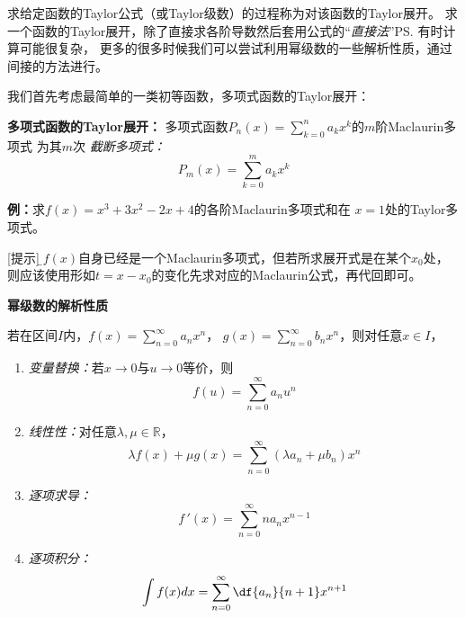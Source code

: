 求给定函数的Taylor公式（或Taylor级数）的过程称为对该函数的{\kaishu Taylor展开}。
求一个函数的Taylor展开，除了直接求各阶导数然后套用公式的“{\it 直接法}”\ps{有时计算可能很复杂}，
更多的很多时候我们可以尝试利用幂级数的一些解析性质，通过间接的方法进行。


我们首先考虑最简单的一类初等函数，多项式函数的Taylor展开：

\begin{thx}
	{\bf 多项式函数的Taylor展开：}
	多项式函数$P_n(x)=\sum\limits_{k=0}^na_kx^k$的$m$阶Maclaurin多项式
	为其$m$次 {\it 截断多项式：} 
	$$P_m(x)=\sum\limits_{k=0}^ma_kx^k$$
\end{thx}

{\bf 例：}求$f(x)=x^3+3x^2-2x+4$的各阶Maclaurin多项式和在
$x=1$处的Taylor多项式。

[提示]：{\b$f(x)$自身已经是一个Maclaurin多项式，但若所求展开式是在某个$x_0$处，
则应该使用形如$t=x-x_0$的变化先求对应的Maclaurin公式，再代回即可。}

\begin{thx}
	{\bf 幂级数的解析性质}
	
	若在区间$I$内，$f(x)=\sum\limits_{n=0}^{\infty}a_nx^n$，
	$g(x)=\sum\limits_{n=0}^{\infty}b_nx^n$，则对任意$x\in I$，
	\begin{enumerate}[(1)]
	  \item {\it 变量替换：}若$x\to 0$与$u\to 0$等价，则
	  $$f(u)=\sum\limits_{n=0}^{\infty}a_nu^n$$
	  \item {\it 线性性：}对任意$\lambda,\mu\in\mathbb{R}$，
	  $$\lambda f(x)+\mu g(x)=\sum\limits_{n=0}^{\infty}(\lambda a_n+\mu
	  b_n)x^n$$ 
	  \item {\it 逐项求导：}
	  $$f\,'(x)=\sum\limits_{n=0}^{\infty}na_{n}x^{n-1}$$ 
	  \item {\it 逐项积分：} 
	  $$\displaystyle\int f(x)dx=\sum\limits_{n=0}^{\infty}
	  \df{a_{n}}{n+1}x^{n+1}$$
	\end{enumerate}
\end{thx}

